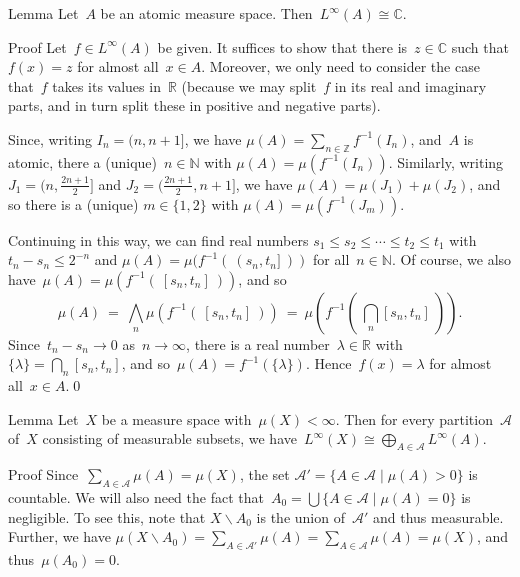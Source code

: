 \documentclass[a]{subfiles}
\begin{document}
\begin{parsec}%
\begin{point}{Lemma}%
Let~$A$ be an atomic measure space.
Then~$L^\infty(A)\cong \mathbb{C}$.
\begin{point}{Proof}
Let~$f\in L^\infty(A)$ be given.
It suffices to show that
there is~$z\in \mathbb{C}$
such that
$f(x)=z$ for almost all~$x\in A$.
Moreover, we only need to consider the case
that~$f$ takes its values in~$\mathbb{R}$
(because we may split~$f$ in its real and imaginary parts,
and in turn split these in positive and negative parts).

Since,
writing  $I_n = (n,n+1]$,
we have $\mu(A) = \sum_{n\in\mathbb{Z}} f^{-1}(I_n)$,
and~$A$ is atomic,
there a (unique)~$n\in \mathbb{N}$
with  $\mu(A)=\mu(f^{-1}(I_n))$.
Similarly,
writing 
$J_{1} = (n,\frac{2n+1}{2}]$
and $J_{2}=(\frac{2n+1}{2},n+1]$,
we have
$\mu(A) = \mu(J_{1}) + \mu(J_{2})$,
and so there is a (unique)  $m\in \{1,2\}$
with $\mu(A)=\mu(f^{-1}(J_{m}))$.

Continuing in this way,
we can find real numbers $s_1 \leq s_2 \leq \dotsb \leq t_2 \leq t_1$
with $t_n-s_n \leq 2^{-n}$
and $\mu(A)=\mu( f^{-1}(\ (s_n,t_n]\ ))$
for all~$n\in \mathbb{N}$.
Of course,
we also have~$\mu(A)=\mu(f^{-1}(\ [s_n,t_n]\ ))$,
and so
\begin{equation*}
\textstyle
\mu(A) \ =\  \bigwedge_n \mu(f^{-1}(\ [s_n,t_n]\ ))
\ =\  \mu(f^{-1}(\ \bigcap_n [s_n,t_n]\ )).
\end{equation*}
Since~$t_n-s_n \to 0$ as~$n\to \infty$,
there is a real number~$\lambda\in \mathbb{R}$
with $\{\lambda \} = \bigcap_n[s_n,t_n]$,
and so~$\mu(A)=f^{-1}(\{\lambda\})$.
Hence~$f(x)=\lambda$ for almost all~$x\in A$.\qed
\end{point}
\end{point}
\begin{point}{Lemma}%
Let~$X$ be a measure space with~$\mu(X)<\infty$.
Then for every partition~$\mathcal{A}$
of~$X$
consisting of measurable subsets,
we have~$L^\infty(X)\cong \bigoplus_{A\in\mathcal{A}} L^\infty(A)$.
\begin{point}{Proof}%
Since~$\sum_{A\in\mathcal{A}} \mu(A)=\mu(X)$,
the set $\mathcal{A}' = \{A\in \mathcal{A}\mid \mu(A)>0\}$
is countable.
We will also
need the fact that~$A_0 = \bigcup\{ A\in\mathcal{A}\mid \mu(A)=0\}$
is negligible.
To see this,
note that
$X\backslash A_0$ is 
the union of~$\mathcal{A}'$
and thus measurable.
Further, we have $\mu(X\backslash A_0) = 
\sum_{A\in \mathcal{A}'} \mu(A)
= \sum_{A\in\mathcal{A}} \mu(A)=\mu(X)$,
and thus~$\mu(A_0)=0$.


\end{point}
\end{point}
\end{parsec}
\end{document}
